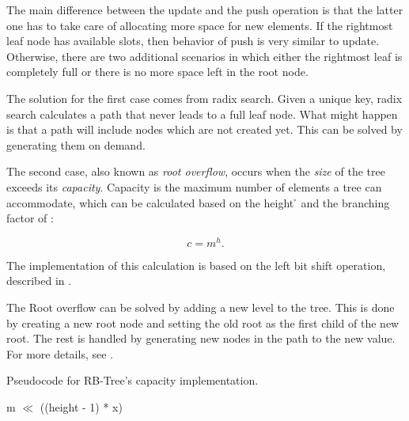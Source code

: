 The main difference between the update and the push operation is that the latter one has to take care of allocating more space for new elements. If the rightmost leaf node has available slots, then behavior of push is very similar to update. Otherwise, there are two additional scenarios in which either the rightmost leaf is completely full or there is no more space left in the root node.

The solution for the first case comes from radix search. Given a unique key, radix search calculates a path that never leads to a full leaf node. What might happen is that a path will include nodes which are not created yet. This can be solved by generating them on demand.

The second case, also known as \emph{root overflow}, occurs when the \emph{size} of the tree exceeds its \emph{capacity}. Capacity is the maximum number of elements a tree can accommodate, which can be calculated based on the height \h{} and the branching factor \m{} of \rbtree{}:

\begin{equation}
	c = m^h.
\end{equation}

The implementation of this calculation is based on the left bit shift operation, described in .

The Root overflow can be solved by adding a new level to the tree. This is done by creating a new root node and setting the old root as the first child of the new root. The rest is handled by generating new nodes in the path to the new value. For more details, see .

\begin{listing}[ht!]
    \caption{Pseudocode for RB-Tree's capacity implementation.}
    \label{lst:rb-tree-capacity}

    \begin{algorithmic}
		\State \Return m $\ll$ ((height - 1) * x)
        \EndFunction
    \end{algorithmic}
\end{listing}

